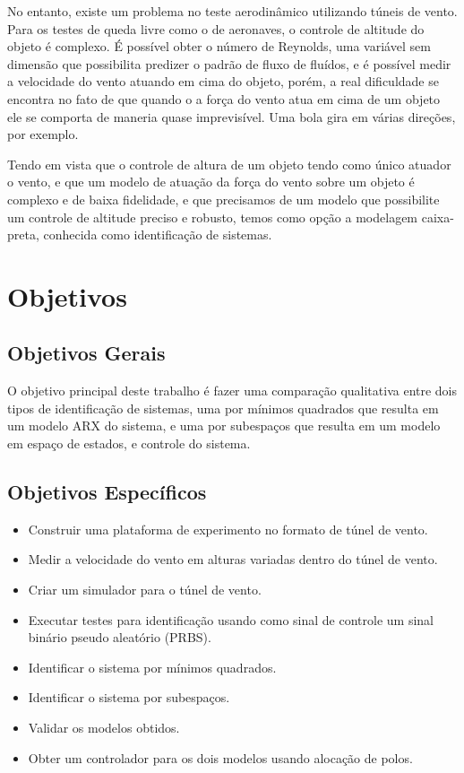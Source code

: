 No entanto, existe um problema no teste aerodinâmico utilizando túneis de vento. Para os testes de queda livre como o de aeronaves, o controle de altitude do objeto é complexo. É possível obter o número de Reynolds, uma variável sem dimensão que possibilita predizer o padrão de fluxo de fluídos, e é possível medir a velocidade do vento atuando em cima do objeto, porém, a real dificuldade se encontra no fato de que quando o a força do vento atua em cima de um objeto ele se comporta de maneria quase imprevisível. Uma bola gira em várias direções, por exemplo.


Tendo em vista que o controle de altura de um objeto tendo como único atuador o vento, e que um modelo de atuação da força do vento sobre um objeto é complexo e de baixa fidelidade, e que precisamos de um modelo que possibilite um controle de altitude preciso e robusto, temos como opção a modelagem caixa-preta, conhecida como identificação de sistemas.


\section{Objetivos}

\subsection{Objetivos Gerais}
O objetivo principal deste trabalho é fazer uma comparação qualitativa entre dois tipos de identificação de sistemas, uma por mínimos quadrados que resulta em um modelo ARX do sistema, e uma por subespaços que resulta em um modelo em espaço de estados, e controle do sistema.

\subsection{Objetivos Específicos}
\begin{itemize}
	\item Construir uma plataforma de experimento no formato de túnel de vento.
	\item Medir a velocidade do vento em alturas variadas dentro do túnel de vento.
	\item Criar um simulador para o túnel de vento.
	\item Executar testes para identificação usando como sinal de controle um sinal binário pseudo aleatório (PRBS).
	\item Identificar o sistema por mínimos quadrados.
	\item Identificar o sistema por subespaços.
	\item Validar os modelos obtidos.
	\item Obter um controlador para os dois modelos usando alocação de polos.
\end{itemize}

